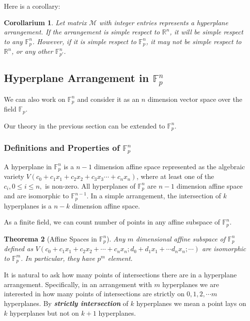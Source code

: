\documentclass[12pt, a4paper]{article}
\newtheorem{theorem}{Theorema}[subsection]
\newtheorem{corollary}[theorem]{Corollarium}
\theoremstyle{definition}
\theoremstyle{remark}
\newcommand{\bb}[1]{\mathbb{#1}}
\renewcommand{\emph}[1]{\textit{\textbf{#1}}}
\begin{document}
Here is a corollary:

\begin{corollary}
	Let matrix $\mathcal{M}$ with integer entries represents a hyperplane arrangement.
	If the arrangement is simple respect to $\bb{R}^n$, it will be simple respect to any $\mathbb{F}_p^n$. 
	However, if it is simple respect to $\mathbb{F}_p^n$, it may not be simple respect to $\bb{R}^n$, or any other $\mathbb{F}_{p'}^n$.
\end{corollary}

\subsection{Hyperplane Arrangement in $\mathbb{F}_p^n$}

We can also work on $\mathbb{F}_p^n$ and consider it as an $n$ dimension vector space over the field $\mathbb{F}_p$. 

Our theory in the previous section can be extended to $\mathbb{F}_p^n$.

\subsubsection{Definitions and Properties of $\mathbb{F}_p^n$}

A hyperplane in $\mathbb{F}_p^n$ is a $n-1$ dimension affine space represented as the algebraic variety $V(c_0 + c_1x_1 + c_2x_2 + c_3x_3 \cdots + c_nx_n)$, where at least one of the $c_i, 0 \leq i \leq n,$ is non-zero. 
All hyperplanes of $\mathbb{F}_p^n$ are $n-1$ dimension affine space and are isomorphic to $\mathbb{F}_p^{n-1}$. In a simple arrangement, the intersection of $k$ hyperplanes is a $n-k$ dimension affine space.

As a finite field, we can count number of points in any affine subspace of $\mathbb{F}_p^n$. 

\begin{theorem}[Affine Spaces in $\mathbb{F}_p^n$]
	Any $m$ dimensional affine subspace of $\mathbb{F}_p^n$ defined as $V(c_0 + c_1x_1+c_2x_2 + \cdots + c_nx_n; d_0 + d_1x_1 + \cdots d_nx_n; \cdots)$ are isomorphic to $\mathbb{F}_p^m$. In particular, they have $p^m$ element.
\end{theorem}

It is natural to ask how many points of intersections there are in a hyperplane arrangement. 
Specifically, in an arrangement with $m$ hyperplanes we are interested in how many points of intersections are strictly on $0, 1, 2, \cdots m$ hyperplanes. 
By \emph{strictly intersection} of $k$ hyperplanes we mean a point lays on $k$ hyperplanes but not on $k+1$ hyperplanes. 
\end{document}
